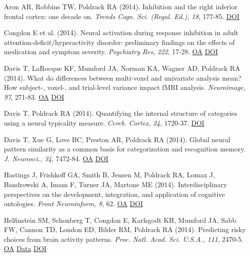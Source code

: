 Aron AR, Robbins TW, Poldrack RA (2014). Inhibition and the right inferior frontal cortex: one decade on. \textit{Trends Cogn. Sci. (Regul. Ed.), 18}, 177-85. \href{http://dx.doi.org/10.1016/j.tics.2013.12.003}{DOI} \vspace{2mm}

Congdon E et al. (2014). Neural activation during response inhibition in adult attention-deficit/hyperactivity disorder: preliminary findings on the effects of medication and symptom severity. \textit{Psychiatry Res, 222}, 17-28. \href{https://www.ncbi.nlm.nih.gov/pmc/articles/PMC4009011}{OA} \href{http://dx.doi.org/10.1016/j.pscychresns.2014.02.002}{DOI} \vspace{2mm}

Davis T, LaRocque KF, Mumford JA, Norman KA, Wagner AD, Poldrack RA (2014). What do differences between multi-voxel and univariate analysis mean? How subject-, voxel-, and trial-level variance impact fMRI analysis. \textit{Neuroimage, 97}, 271-83. \href{https://www.ncbi.nlm.nih.gov/pmc/articles/PMC4115449}{OA} \href{http://dx.doi.org/10.1016/j.neuroimage.2014.04.037}{DOI} \vspace{2mm}

Davis T, Poldrack RA (2014). Quantifying the internal structure of categories using a neural typicality measure. \textit{Cereb. Cortex, 24}, 1720-37. \href{http://dx.doi.org/10.1093/cercor/bht014}{DOI} \vspace{2mm}

Davis T, Xue G, Love BC, Preston AR, Poldrack RA (2014). Global neural pattern similarity as a common basis for categorization and recognition memory. \textit{J. Neurosci., 34}, 7472-84. \href{https://www.ncbi.nlm.nih.gov/pmc/articles/PMC4035513}{OA} \href{http://dx.doi.org/10.1523/jneurosci.3376-13.2014}{DOI} \vspace{2mm}

Hastings J, Frishkoff GA, Smith B, Jensen M, Poldrack RA, Lomax J, Bandrowski A, Imam F, Turner JA, Martone ME (2014). Interdisciplinary perspectives on the development, integration, and application of cognitive ontologies. \textit{Front Neuroinform, 8}, 62. \href{https://www.ncbi.nlm.nih.gov/pmc/articles/PMC4064452}{OA} \href{http://dx.doi.org/10.3389/fninf.2014.00062}{DOI} \vspace{2mm}

Helfinstein SM, Schonberg T, Congdon E, Karlsgodt KH, Mumford JA, Sabb FW, Cannon TD, London ED, Bilder RM, Poldrack RA (2014). Predicting risky choices from brain activity patterns. \textit{Proc. Natl. Acad. Sci. U.S.A., 111}, 2470-5. \href{https://www.ncbi.nlm.nih.gov/pmc/articles/PMC3932884}{OA} \href{https://openneuro.org/datasets/ds000030/versions/1.0.0}{Data} \href{http://dx.doi.org/10.1073/pnas.1321728111}{DOI} \vspace{2mm}


